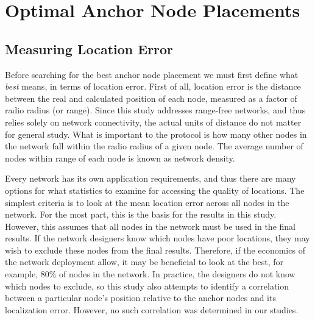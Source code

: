 \chapter{Optimal Anchor Node Placements}
\label{chap:placments}
\section{Measuring Location Error}
Before searching for the best anchor node placement we must first define what \emph{best} means, in terms of location error.  First of all, location error is the distance between the real and calculated position of each node, measured as a factor of radio radius (or range).  Since this study addresses range-free networks, and thus relies solely on network connectivity, the actual units of distance do not matter for general study.  What is important to the protocol is how many other nodes in the network fall within the radio radius of a given node.  The average number of nodes within range of each node is known as network density.

Every network has its own application requirements, and thus there are many options for what statistics to examine for accessing the quality of locations.  The simplest criteria is to look at the mean location error across all nodes in the network.  For the most part, this is the basis for the results in this study.  However, this assumes that all nodes in the network must be used in the final results.  If the network designers know which nodes have poor locations, they may wish to exclude these nodes from the final results.  Therefore, if the economics of the network deployment allow, it may be beneficial to look at the best, for example, 80\% of nodes in the network.  In practice, the designers do not know which nodes to exclude, so this study also attempts to identify a correlation between a particular node's position relative to the anchor nodes and its localization error.  However, no such correlation was determined in our studies.

